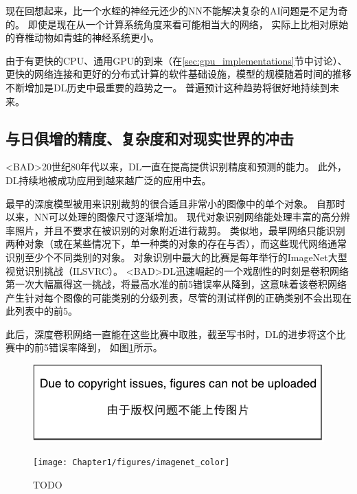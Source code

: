 现在回想起来，比一个水蛭的神经元还少的\gls{NN}不能解决复杂的\gls{AI}问题是不足为奇的。
即使是现在从一个计算系统角度来看可能相当大的网络， 实际上比相对原始的脊椎动物如青蛙的神经系统更小。

由于有更快的CPU、通用GPU的到来（在\ref{sec:gpu_implementations}节中讨论）、更快的网络连接和更好的分布式计算的软件基础设施，模型的规模随着时间的推移不断增加是\gls{DL}历史中最重要的趋势之一。
普遍预计这种趋势将很好地持续到未来。


\subsection{与日俱增的精度、复杂度和对现实世界的冲击}
\label{sec:increasing_accuracy_complexity_and_real_world_impact}

<BAD>20世纪80年代以来，\gls{DL}一直在提高提供识别精度和预测的能力。
此外，\gls{DL}持续地被成功应用到越来越广泛的应用中去。

最早的深度模型被用来识别裁剪的很合适且非常小的图像中的单个对象\citep{Rumelhart86}。
自那时以来，\gls{NN}可以处理的图像尺寸逐渐增加。
现代对象识别网络能处理丰富的高分辨率照片，并且不要求在被识别的对象附近进行裁剪\citep{Krizhevsky-2012}。
类似地，最早网络只能识别两种对象（或在某些情况下，单一种类的对象的存在与否），而这些现代网络通常识别至少个不同类别的对象。
对象识别中最大的比赛是每年举行的ImageNet大型视觉识别挑战（ILSVRC）。
<BAD>\gls{DL}迅速崛起的一个戏剧性的时刻是卷积网络第一次大幅赢得这一挑战，将最高水准的前5错误率从降到\citep{Krizhevsky-2012}，这意味着该卷积网络产生针对每个图像的可能类别的分级列表，尽管的测试样例的正确类别不会出现在此列表中的前5。

此后，深度卷积网络一直能在这些比赛中取胜，截至写书时，\gls{DL}的进步将这个比赛中的前5错误率降到， 如图\ref{fig:chap1_imagenet_color}所示。
\begin{figure}[!htb]
\ifOpenSource
\centerline{\includegraphics{figure.pdf}}
\else
\centerline{\texttt{[image: Chapter1/figures/imagenet\_color]}}
\fi
\caption{TODO}
\label{fig:chap1_imagenet_color}
\end{figure}

